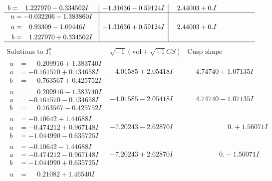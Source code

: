 \documentclass[1p]{elsarticle_modified}
\theoremstyle{definition}
\newcommand{\I}{\sqrt{-1}}
\begin{document}
$$\begin{array}{c|c|c}
\begin{aligned}
b &= \phantom{-}1.227970 - 0.334502 I\end{aligned}
 & -1.31636 - 0.59124 I & \phantom{-}2.44003 + 0. I\phantom{ +0.000000I} \\ \hline\begin{aligned}
u &= -0.032206 - 1.383860 I \\
a &= \phantom{-}0.93309 - 1.09446 I \\
b &= \phantom{-}1.227970 + 0.334502 I\end{aligned}
 & -1.31636 + 0.59124 I & \phantom{-}2.44003 + 0. I\phantom{ +0.000000I}\\
 \hline 
 \end{array}$$\newpage$$\begin{array}{c|c|c}  
\text{Solutions to }I^u_{1}& \I (\text{vol} + \sqrt{-1}CS) & \text{Cusp shape}\\
 \hline 
\begin{aligned}
u &= \phantom{-}0.209916 + 1.383740 I \\
a &= -0.161570 + 0.134658 I \\
b &= \phantom{-}0.763567 + 0.425752 I\end{aligned}
 & -4.01585 + 2.05418 I & \phantom{-}4.74740 + 1.07135 I \\ \hline\begin{aligned}
u &= \phantom{-}0.209916 - 1.383740 I \\
a &= -0.161570 - 0.134658 I \\
b &= \phantom{-}0.763567 - 0.425752 I\end{aligned}
 & -4.01585 - 2.05418 I & \phantom{-}4.74740 - 1.07135 I \\ \hline\begin{aligned}
u &= -0.10642 + 1.44688 I \\
a &= -0.474212 + 0.967148 I \\
b &= -1.044990 - 0.635725 I\end{aligned}
 & -7.20243 - 2.62870 I & \phantom{-0.000000 -}0. + 1.56071 I \\ \hline\begin{aligned}
u &= -0.10642 - 1.44688 I \\
a &= -0.474212 - 0.967148 I \\
b &= -1.044990 + 0.635725 I\end{aligned}
 & -7.20243 + 2.62870 I & \phantom{-0.000000 } 0. - 1.56071 I \\ \hline\begin{aligned}
u &= \phantom{-}0.21082 + 1.46540 I \\

\end{aligned}
\end{array}$$
\end{document}
